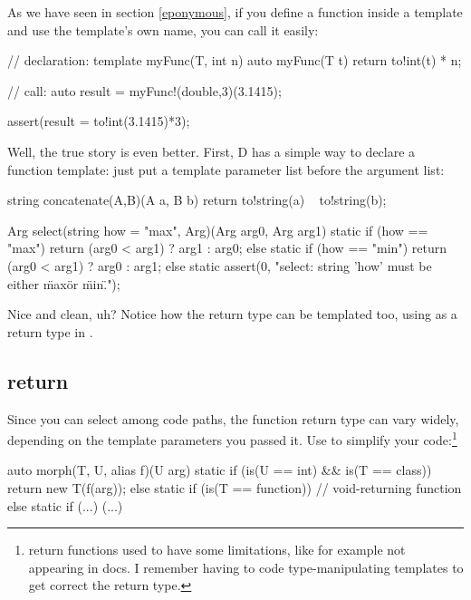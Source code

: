 As we have seen in section \ref{eponymous}, if you define a function inside a template and use the template's own name, you can call it easily:

\begin{dcode}
// declaration:
template myFunc(T, int n)
{
    auto myFunc(T t) { return to!int(t) * n;}
}

// call:
auto result = myFunc!(double,3)(3.1415);

assert(result = to!int(3.1415)*3);
\end{dcode}

Well, the true story is even better. First, D has a simple way to declare a function template: just put a template parameter list before the argument list:

\begin{dcode}
string concatenate(A,B)(A a, B b)
{
    return to!string(a) ~ to!string(b);
}

Arg select(string how = "max", Arg)(Arg arg0, Arg arg1)
{
    static if (how == "max")
        return (arg0 < arg1) ? arg1 : arg0;
    else static if (how == "min")
        return (arg0 < arg1) ? arg0 : arg1;
    else
        static assert(0, 
        "select: string 'how' must be either \"max\" or \"min\".");
}      
\end{dcode}

Nice and clean, uh? Notice how the return type can be templated too, using  as a return type in . 

\subsection{ return}\label{autoreturn}

Since you can select among code paths, the function return type can vary widely, depending on the template parameters you passed it. Use  to simplify your code:\footnote{  return functions used to have some limitations, like for example not appearing in docs. I remember having to code type-manipulating templates to get correct the return type.}

\begin{dcode}
auto morph(T, U, alias f)(U arg)
{
    static if (is(U == int) && is(T == class))
    {
        return new T(f(arg));
    }
    else static if (is(T == function))
    {} // void-returning function
    else static if (...)
    (...)
}
\end{dcode}

